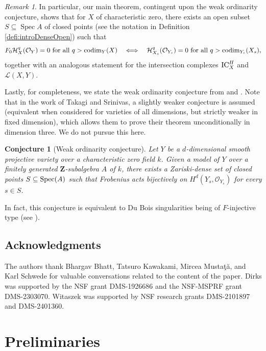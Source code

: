 \documentclass[letterpaper,11pt]{amsart}
\theoremstyle{plain}
\newtheorem{conj}[thm]{Conjecture}
\theoremstyle{definition}
\theoremstyle{remark}
\newtheorem{rmk}[thm]{Remark}
\def\Z{{\mathbf Z}}
\def\cH{\mathcal{H}}
\def\cL{\mathcal{L}}
\def\cO{\mathcal{O}}
\DeclareMathOperator{\Spec} {Spec}
\begin{document}
\begin{rmk}
In particular, our main theorem, contingent upon the weak ordinarity conjecture, shows that for $X$ of characteristic zero, there exists an open subset $S \subseteq \Spec A$ of closed points (see the notation in Definition \ref{defi:introDenseOpen}) such that
\[
F_0 \cH^q_X(\cO_Y) = 0 \text{ for all } q > {\rm codim}_Y(X)
\quad\Longleftrightarrow\quad
\cH^q_{X_s}(\cO_{Y_s}) = 0 \text{ for all } q > {\rm codim}_{Y_s}(X_s),
\]
together with an analogous statement for the intersection complexes ${\rm IC}_X^H$ and $\cL(X,Y)$.
\end{rmk}

Lastly, for completeness, we state the weak ordinarity conjecture from \cite[Conjecture 1.1]{MS11} and \cite[Conjecture 1.1]{BST}. Note that in the work of Takagi and Srinivas, a slightly weaker conjecture is assumed (equivalent when considered for varieties of all dimensions, but strictly weaker in fixed dimension), which allows them to prove their theorem unconditionally in dimension three. We do not pursue this here.
\begin{conj}[Weak ordinarity conjecture] \label{conj:weakordinarity}
Let $Y$ be a $d$-dimensional smooth projective variety over a characteristic zero field $k$. Given a model of $Y$ over a finitely generated $\Z$-subalgebra $A$ of $k$, there exists a Zariski-dense set of closed points $S \subseteq {\rm Spec}(A)$ such that Frobenius acts bijectively on $H^d(Y_s, \cO_{Y_s})$ for every $s \in S$.
\end{conj}

In fact, this conjecture is equivalent to Du Bois singularities being of $F$-injective type (see \cites{BST,MS11}).



\subsection{Acknowledgments}
The authors thank Bhargav Bhatt, Tatsuro Kawakami, Mircea Musta{\c{t}}{\u{a}}, and Karl Schwede for valuable conversations related to the content of the paper. Dirks was supported by the NSF grant DMS-1926686 and the NSF-MSPRF grant DMS-2303070. Witaszek was supported by NSF research grants DMS-2101897 and DMS-2401360.
\section{Preliminaries} 
\end{document}
